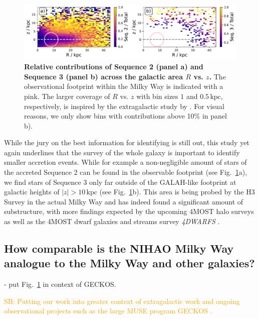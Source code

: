 \documentclass[fleqn,usenatbib]{mnras}
\newcommand{\SB}[1]{{\textcolor{orange}{SB: #1}}}
\begin{document}
\begin{figure}
	\includegraphics[width=\textwidth]{figures/accretion_rates.pdf}
    \caption{
    \textbf{Relative contributions of Sequence 2 (panel a) and Sequence 3 (panel b) across the galactic area $R$ vs. $z$.} The observational footprint within the Milky Way is indicated with a pink. The larger coverage of $R$ vs. $z$ with bin sizes $1$ and $0.5\,\mathrm{kpc}$, respectively, is inspired by the extragalactic study by \citet[][their Fig.~16]{Martig2021}. For visual reasons, we only show bins with contributions above 10\% in panel b).
    }
    \label{fig:accretion_rate}
\end{figure}

While the jury on the best information for identifying is still out, this study yet again underlines that the survey of the whole galaxy is important to identify smaller accretion events. While for example a non-negligible amount of stars of the accreted Sequence 2 can be found in the observable footprint (see Fig.~\ref{fig:accretion_rate}a), we find stars of Sequence 3 only far outside of the GALAH-like footprint at galactic heights of $\vert z \vert > 10\,\mathrm{kpc}$ (see Fig.~\ref{fig:accretion_rate}b). This area is being probed by the H3 Survey \citep{Conroy2019} in the actual Milky Way and has indeed found a significant amount of substructure, with more findings expected by the upcoming 4MOST halo surveys \citep{4MOST_HR_Halo, 4MOST_LR_Halo} as well as the 4MOST dwarf galaxies and streams survey \textit{4DWARFS} \citep{4DWARFS2023}.

\subsection{How comparable is the NIHAO Milky Way analogue to the Milky Way and other galaxies?} \label{sec:discussion_how_comparable_are_nihao_and_milkyway}

- put Fig.~\ref{fig:accretion_rate} in context of GECKOS.

\SB{Putting our work into greater context of extragalactic work \citep[e.g.][]{Pinna2019, Pinna2019b, Martig2021} and ongoing observational projects such as the large MUSE program GECKOS \citep{GECKOS2023}.}
\end{document}
